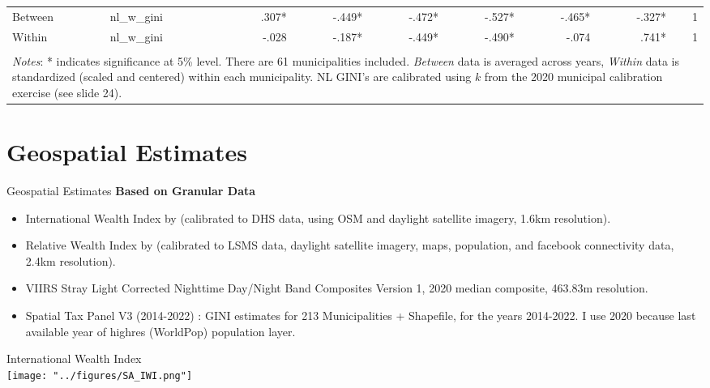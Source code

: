 \documentclass[compress,xcolor=dvipsnames]{beamer}
\newenvironment{noheadline}{
    \setbeamertemplate{headline}{}
    \addtobeamertemplate{frametitle}{\vspace*{-0.9\baselineskip}}{}
}{}
\begin{document}
\begin{frame}
\begin{table}[ht]
{\begin{tabular}{llrrrrrrr}
  Between & nl\_w\_gini &   .307* &  -.449* &  -.472* &  -.527* &  -.465* &  -.327* &    1    \\ 
  Within & nl\_w\_gini &  -.028  &  -.187* &  -.449* &  -.490* &  -.074  &   .741* &    1    \\   
   \bottomrule \\ [-1em]
   \multicolumn{9}{l}{\parbox{1.25\textwidth}{\footnotesize \textit{Notes}: * indicates significance at 5\% level. There are 61 municipalities included. \textit{Between} data is averaged across years, \textit{Within} data is standardized (scaled and centered) within each municipality. NL GINI's are calibrated using $k$ from the 2020 municipal calibration exercise (see slide 24). }}
\end{tabular}
}
\end{table}
\end{frame}

\section{Geospatial Estimates}

\begin{noheadline}
\begin{frame}{Geospatial Estimates}
\textbf{Based on Granular Data}
\begin{itemize}
\item International Wealth Index by \citet{lee2022high} (calibrated to DHS data, using OSM and daylight satellite imagery, 1.6km resolution).
\item Relative Wealth Index by \citet{chi2022microestimates} (calibrated to LSMS data, daylight satellite imagery, maps, population, and facebook connectivity data, 2.4km resolution).
\item VIIRS Stray Light Corrected Nighttime Day/Night Band Composites Version 1, 2020 median composite, 463.83m resolution.
\item Spatial Tax Panel V3 (2014-2022) \citep{STP3}: GINI estimates for 213 Municipalities + Shapefile, for the years 2014-2022. I use 2020 because last available year of highres (WorldPop) population layer. 
\end{itemize}
\end{frame}
\end{noheadline}


\begin{frame}
International Wealth Index \\ %
\texttt{[image: "../figures/SA\_IWI.png"]}
\end{frame}
\end{document}
